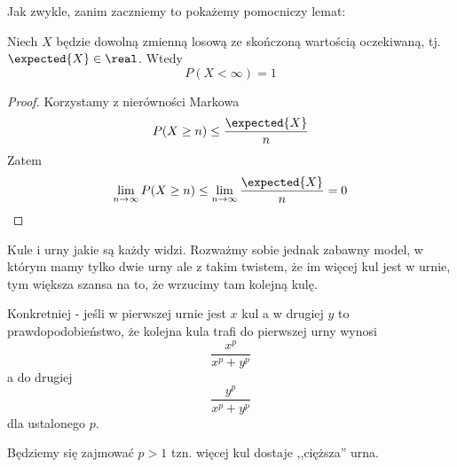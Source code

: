 
Jak zwykle, zanim zaczniemy to pokażemy pomocniczy lemat:
\begin{lemma}
	\label{if-expected-is-finite-then-variable-is-finite}
	Niech \( X \) będzie dowolną zmienną losową ze skończoną wartością oczekiwaną, tj. \( \expected{X} \in \real \).
	Wtedy
	\[
		P(X < \infty) = 1
	\]
\end{lemma}
\begin{proof}
	Korzystamy z nierówności Markowa
	\[
		P(X \geq n) \leq \frac{\expected{X}}{n}
	\]
	Zatem
	\[
		\lim_{n \rightarrow \infty} P(X \geq n) \leq \lim_{n \rightarrow \infty} \frac{\expected{X}}{n} = 0
	\]
\end{proof}


Kule i urny jakie są każdy widzi. Rozważmy sobie jednak zabawny model, w którym mamy tylko dwie urny ale z takim twistem, że im więcej kul jest w urnie, tym większa szansa na to, że wrzucimy tam kolejną kulę.

Konkretniej - jeśli w pierwszej urnie jest \( x \) kul a w drugiej \( y \) to prawdopodobieństwo, że kolejna kula trafi do pierwszej urny wynosi \[ \frac{x^p}{x^p + y^p} \] a do drugiej \[ \frac{y^p}{x^p + y^p} \]
dla ustalonego \( p \).

Będziemy się zajmować \( p > 1 \) tzn. więcej kul dostaje ,,cięższa'' urna.

